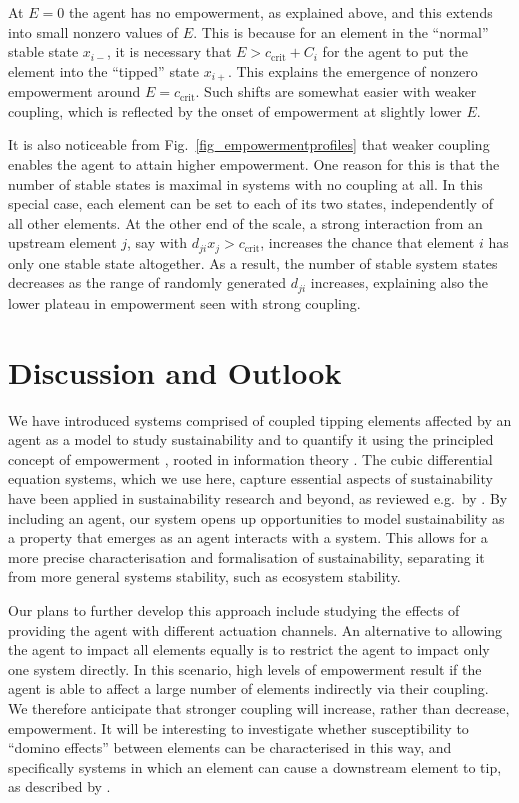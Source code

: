 \documentclass[letterpaper]{article}
\newcommand{\ccrit}{\ensuremath{c_{\mathrm{crit}}}}
\begin{document}
At $E = 0$ the agent has no empowerment, as explained above, and this
extends into small nonzero values of $E$. This is because for an
element in the ``normal'' stable state $x_{i-}$, it is necessary that
$E > \ccrit + C_i$ for the agent to put the element into the
``tipped'' state $x_{i+}$. This explains the emergence of nonzero
empowerment around $E = \ccrit$. Such shifts are somewhat easier with
weaker coupling, which is reflected by the onset of empowerment at
slightly lower $E$.

It is also noticeable from Fig.~\ref{fig_empowermentprofiles} that
weaker coupling enables the agent to attain higher empowerment. One
reason for this is that the number of stable states is maximal in
systems with no coupling at all. In this special case, each element
can be set to each of its two states, independently of all other
elements. At the other end of the scale, a strong interaction from an
upstream element $j$, say with $d_{ji} x_j > \ccrit$, increases the
chance that element $i$ has only one stable state altogether. As a
result, the number of stable system states decreases as the range of
randomly generated $d_{ji}$ increases, explaining also the lower
plateau in empowerment seen with strong coupling.


\section{Discussion and Outlook}


We have introduced systems comprised of coupled tipping elements
affected by an agent as a model to study sustainability and to
quantify it using the principled concept of empowerment
\citep{Salge2014_empowermentintro}, rooted in information theory
\citep{CoverThomas1991_informationtheory}. The cubic differential
equation systems, which we use here, capture essential aspects of
sustainability have been applied in sustainability research and
beyond, as reviewed e.g.\ by
\citet{Klose2019_interactingtippingelements}. By including an agent,
our system opens up opportunities to model sustainability as a
property that emerges as an agent interacts with a system. This allows
for a more precise characterisation and formalisation of
sustainability, separating it from more general systems stability,
such as ecosystem stability.

Our plans to further develop this approach include studying the
effects of providing the agent with different actuation channels. An
alternative to allowing the agent to impact all elements equally is to
restrict the agent to impact only one system directly. In this
scenario, high levels of empowerment result if the agent is able to
affect a large number of elements indirectly via their coupling. We
therefore anticipate that stronger coupling will increase, rather than
decrease, empowerment. It will be interesting to investigate whether
susceptibility to ``domino effects'' between elements can be
characterised in this way, and specifically systems in which an
element can cause a downstream element to tip, as described by
\citet{Brummitt2015_coupledcatastrophes}.
\end{document}
